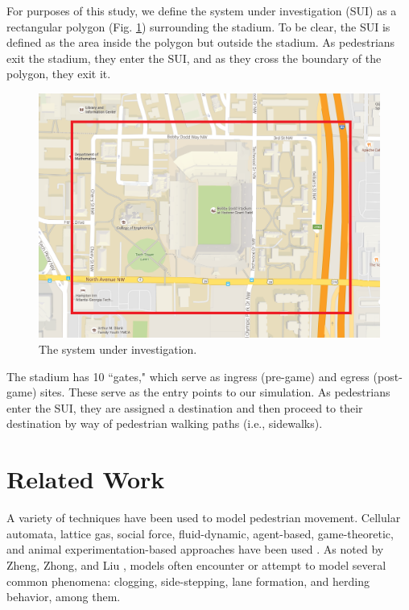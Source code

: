 \documentclass[12pt]{article}
\begin{document}
For purposes of this study, we define the system under investigation (SUI) as a
rectangular polygon (Fig. \ref{fig:polygon}) surrounding the stadium. To be
clear, the SUI is defined as the area inside the polygon but outside the
stadium. As pedestrians exit the stadium, they enter the SUI, and as they cross
the boundary of the polygon, they exit it.

\begin{figure}[H]
  \includegraphics[width=\linewidth,natwidth=1036,natheight=742]{cropped_map.png}
  \caption{The system under investigation.}
  \label{fig:polygon}
\end{figure}

The stadium has 10 “gates," which serve as ingress (pre-game) and egress
(post-game) sites. These serve as the entry points to our simulation. As
pedestrians enter the SUI, they are assigned a destination and then proceed
to their destination by way of pedestrian walking paths (i.e., sidewalks).

\section{Related Work}
\label{sec:literature}

A variety of techniques have been used to model pedestrian movement. Cellular
automata, lattice gas, social force, fluid-dynamic, agent-based, game-theoretic,
and animal experimentation-based approaches have been used
\cite{zheng2009modeling}. As noted by Zheng, Zhong, and Liu
\cite{zheng2009modeling}, models often encounter or attempt to model several
common phenomena: clogging, side-stepping, lane formation, and herding
behavior, among them.
\end{document}
